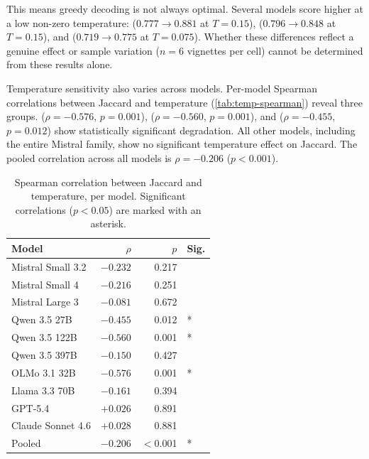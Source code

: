 This means greedy decoding is not always optimal. Several models score
higher at a low non-zero temperature:
 ($0.777 \to 0.881$ at $T = 0.15$),
 ($0.796 \to 0.848$ at $T = 0.15$), and
 ($0.719 \to 0.775$ at $T = 0.075$). Whether
these differences reflect a genuine effect or sample variation ($n = 6$
vignettes per cell) cannot be determined from these results alone.

Temperature sensitivity also varies across models.
Per-model Spearman correlations between Jaccard and temperature
(\autoref{tab:temp-spearman}) reveal three groups.
 ($\rho = -0.576$, $p = 0.001$),
 ($\rho = -0.560$, $p = 0.001$), and
 ($\rho = -0.455$, $p = 0.012$) show
statistically significant degradation. All other models, including the
entire Mistral family, show no significant temperature effect on Jaccard.
The pooled correlation across all models is $\rho = -0.206$ ($p < 0.001$).

\begin{table}[t]
  \centering
  \caption{Spearman correlation between Jaccard and temperature, per model.
    Significant correlations ($p < 0.05$) are marked with an asterisk.}
  \label{tab:temp-spearman}
  \begin{tabular}{lrrl}
    \toprule
    Model & $\rho$ & $p$ & Sig. \\
    \midrule
    Mistral Small 3.2  & $-0.232$ & 0.217 & \\
    Mistral Small 4    & $-0.216$ & 0.251 & \\
    Mistral Large 3    & $-0.081$ & 0.672 & \\
    Qwen 3.5 27B       & $-0.455$ & 0.012 & * \\
    Qwen 3.5 122B      & $-0.560$ & 0.001 & * \\
    Qwen 3.5 397B      & $-0.150$ & 0.427 & \\
    OLMo 3.1 32B       & $-0.576$ & 0.001 & * \\
    Llama 3.3 70B      & $-0.161$ & 0.394 & \\
    GPT-5.4            & $+0.026$ & 0.891 & \\
    Claude Sonnet 4.6  & $+0.028$ & 0.881 & \\
    \midrule
    Pooled             & $-0.206$ & $<$0.001 & * \\
    \bottomrule
  \end{tabular}
\end{table}


